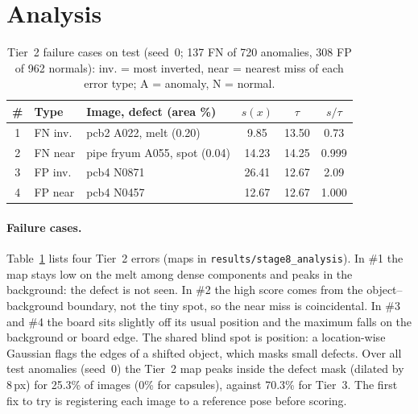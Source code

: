 \section{Analysis}
\label{sec:analysis}

\begin{table}[t]
  \centering
  \footnotesize
  \setlength{\tabcolsep}{1.8pt}
  \begin{tabular}{@{}cllccc@{}}
    \toprule
    \# & Type & Image, defect (area \%) & $s(x)$ & $\tau$ & $s/\tau$ \\
    \midrule
    1 & FN inv. & pcb2 A022, melt (0.20) & 9.85 & 13.50 & 0.73 \\
    2 & FN near & pipe fryum A055, spot (0.04) & 14.23 & 14.25 & 0.999 \\
    3 & FP inv. & pcb4 N0871 & 26.41 & 12.67 & 2.09 \\
    4 & FP near & pcb4 N0457 & 12.67 & 12.67 & 1.000 \\
    \bottomrule
  \end{tabular}
  \caption{Tier~2 failure cases on test (seed~0; 137 FN of 720 anomalies, 308 FP of 962 normals):
    inv. = most inverted, near = nearest miss of each error type; A = anomaly, N = normal.}
  \label{tab:failures}
\end{table}

\paragraph{Failure cases.}
Table~\ref{tab:failures} lists four Tier~2 errors (maps in \texttt{results/stage8\_analysis}).
In \#1 the map stays low on the melt among dense components and peaks in the background: the defect is
not seen.
In \#2 the high score comes from the object--background boundary, not the tiny spot, so the near miss is
coincidental.
In \#3 and \#4 the board sits slightly off its usual position and the maximum falls on the background or
board edge.
The shared blind spot is position: a location-wise Gaussian flags the edges of a shifted object, which
masks small defects.
Over all test anomalies (seed~0) the Tier~2 map peaks inside the defect mask (dilated by 8\,px) for 25.3\% of
images (0\% for capsules), against 70.3\% for Tier~3.
The first fix to try is registering each image to a reference pose before scoring.

